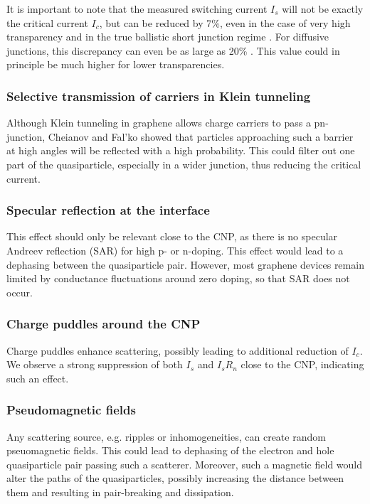 It is important to note that the measured switching current $I_s$ will not be exactly the critical current $I_c$, but can be reduced by 7\%, even in the case of very high transparency and in the true ballistic short junction regime \cite{lee_ultimately_2015}.
For diffusive junctions, this discrepancy can even be as large as 20\% \cite{ke_critical_2016}.
This value could in principle be much higher for lower transparencies.

\subsubsection{Selective transmission of carriers in Klein tunneling}
Although Klein tunneling in graphene allows charge carriers to pass a pn-junction, Cheianov and Fal'ko showed that particles approaching such a barrier at high angles will be reflected with a high probability.\cite{chialvoCurrentphaseRelationGraphene2010}
This could filter out one part of the quasiparticle, especially in a wider junction, thus reducing the critical current.\cite{benshalom_quantum_2015}

\subsubsection{Specular reflection at the interface}
This effect should only be relevant close to the CNP, as there is no specular Andreev reflection (SAR) for high p- or n-doping.
This effect would lead to a dephasing between the quasiparticle pair.
However, most graphene devices remain limited by conductance fluctuations around zero doping, so that SAR does not occur.

\subsubsection{Charge puddles around the CNP}
Charge puddles enhance scattering, possibly leading to additional reduction of $I_c$.
We observe a strong suppression of both $I_s$ and $I_s R_n$ close to the CNP, indicating such an effect.

\subsubsection{Pseudomagnetic fields}
Any scattering source, e.g. ripples or inhomogeneities, can create random pseuomagnetic fields.
This could lead to dephasing of the electron and hole quasiparticle pair passing such a scatterer.
Moreover, such a magnetic field would alter the paths of the quasiparticles, possibly increasing the distance between them and resulting in pair-breaking and dissipation.


